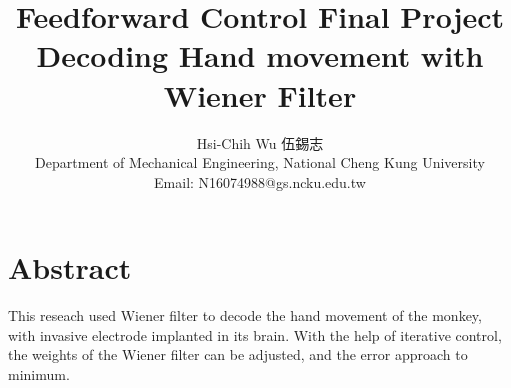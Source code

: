 \documentclass[8pt,a4paper]{article}
\begin{document}
\title{ \bf{ Feedforward Control Final Project \\  Decoding Hand movement with Wiener Filter }}
\author{ Hsi-Chih Wu 伍錫志 \\ Department of Mechanical Engineering, National Cheng Kung University \\ Email: N16074988@gs.ncku.edu.tw  }
\date{}

\maketitle

\section*{Abstract}

This reseach used Wiener filter to decode the hand movement of the monkey, with invasive electrode implanted in its brain. 
With the help of iterative control, the weights of the Wiener filter can be adjusted, and the error approach to minimum.
\end{document}
